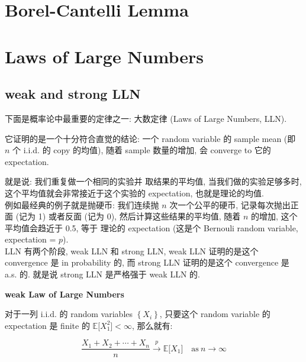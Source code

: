 \documentclass{qlnotes-export}
\begin{document}
\section{Borel-Cantelli Lemma}\label{borel-cantelli-lemma}

\section{Laws of Large Numbers}\label{laws-of-large-numbers}

\subsection{weak and strong LLN}\label{weak-and-strong-lln}

下面是概率论中最重要的定律之一: 大数定律 (Laws of Large Numbers, LLN).

它证明的是一个十分符合直觉的结论: 一个 random variable 的 sample mean (即 \(n\) 个 i.i.d. 的 copy 的均值), 随着 sample 数量的增加, 会 converge to 它的 expectation.

就是说: 我们重复做一个相同的实验并 取结果的平均值, 当我们做的实验足够多时, 这个平均值就会非常接近于这个实验的 expectation, 也就是理论的均值.\\
例如最经典的例子就是抛硬币: 我们连续抛 \(n\) 次一个公平的硬币, 记录每次抛出正面 (记为 1) 或者反面 (记为 0), 然后计算这些结果的平均值, 随着 \(n\) 的增加, 这个平均值会趋近于 0.5, 等于 理论的 expectation (这是个 Bernouli random variable, expectation = \(p\)).\\
LLN 有两个阶段, weak LLN 和 strong LLN, weak LLN 证明的是这个 convergence 是 in probability 的, 而 strong LLN 证明的是这个 convergence 是 a.s. 的. 就是说 strong LLN 是严格强于 weak LLN 的.

\begin{theorem}{\protect{}\label{kn-weak-law-of-large-numbers}{\textbf{weak
Law of Large Numbers}}}\label{thm-04-lln-weak-law-of-large-numbers}

对于一列 i.i.d. 的 random variables \(\left\{ X_{i} \right\}\), 只要这个 random variable 的 expectation 是 finite 的 \({\mathbb{E}}\lbrack X_{1}^{2}\rbrack < \infty\), 那么就有:

\[\frac{X_{1} + X_{2} + \cdots + X_{n}}{n}\overset{p}{\rightarrow}{\mathbb{E}}\lbrack X_{1}\rbrack\quad\text{as}\ n\rightarrow\infty\]

\end{theorem}
\end{document}
